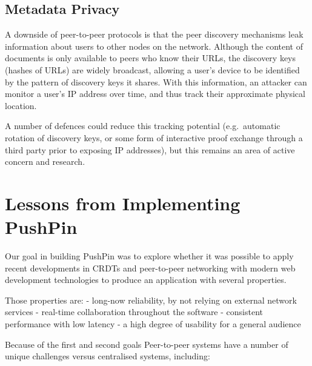 \documentclass[sigplan,10pt]{acmart}
\begin{document}
\subsection{Metadata Privacy}

A downside of peer-to-peer protocols is that the peer discovery mechanisms leak information about users to other nodes on the network.
Although the content of documents is only available to peers who know their URLs, the discovery keys (hashes of URLs) are widely broadcast, allowing a user's device to be identified by the pattern of discovery keys it shares.
With this information, an attacker can monitor a user's IP address over time, and thus track their approximate physical location.

A number of defences could reduce this tracking potential (e.g.\ automatic rotation of discovery keys, or some form of interactive proof exchange through a third party prior to exposing IP addresses), but this remains an area of active concern and research.


\section{Lessons from Implementing PushPin}\label{sec:lessons}

Our goal in building PushPin was to explore whether it was possible to apply recent developments in CRDTs and peer-to-peer networking with modern web development technologies to produce an application with several properties.

Those properties are:
 - long-now reliability, by not relying on external network services
 - real-time collaboration throughout the software
 - consistent performance with low latency
 - a high degree of usability for a general audience 

Because of the first and second goals Peer-to-peer systems have a number of unique challenges versus centralised systems, including:
\end{document}
